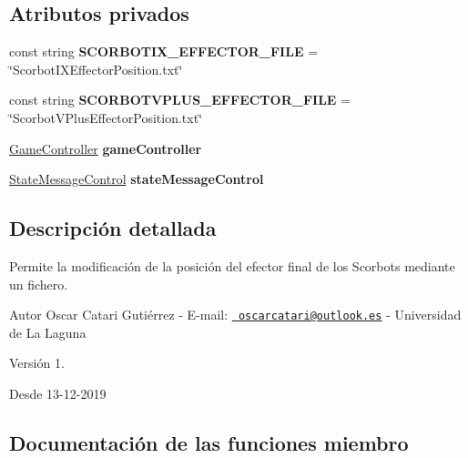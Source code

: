 \subsection*{Atributos privados}
\begin{DoxyCompactItemize}
\item 
\mbox{\label{class_effector_file_control_aeb6ee05c1ee77d1980e98e2849338985}} 
const string {\bfseries S\+C\+O\+R\+B\+O\+T\+I\+X\+\_\+\+E\+F\+F\+E\+C\+T\+O\+R\+\_\+\+F\+I\+LE} = \char`\"{}Scorbot\+I\+X\+Effector\+Position.\+txt\char`\"{}
\item 
\mbox{\label{class_effector_file_control_a1f2d3cccfad73eb793f6c4cbc4a9cf4c}} 
const string {\bfseries S\+C\+O\+R\+B\+O\+T\+V\+P\+L\+U\+S\+\_\+\+E\+F\+F\+E\+C\+T\+O\+R\+\_\+\+F\+I\+LE} = \char`\"{}Scorbot\+V\+Plus\+Effector\+Position.\+txt\char`\"{}
\item 
\mbox{\label{class_effector_file_control_a6fcde661797253af8d1ad25f18d9c691}} 
\mbox{\hyperlink{class_game_controller}{Game\+Controller}} {\bfseries game\+Controller}
\item 
\mbox{\label{class_effector_file_control_ac194b508c0cdfed19f1a89365a222037}} 
\mbox{\hyperlink{class_state_message_control}{State\+Message\+Control}} {\bfseries state\+Message\+Control}
\end{DoxyCompactItemize}


\subsection{Descripción detallada}
Permite la modificación de la posición del efector final de los Scorbots mediante un fichero. \begin{DoxyAuthor}{Autor}
Oscar Catari Gutiérrez -\/ E-\/mail\+: \href{mailto:oscarcatari@outlook.es}{\texttt{ oscarcatari@outlook.\+es}} -\/ Universidad de La Laguna 
\end{DoxyAuthor}
\begin{DoxyVersion}{Versión}
1. 
\end{DoxyVersion}
\begin{DoxySince}{Desde}
13-\/12-\/2019 
\end{DoxySince}


\subsection{Documentación de las funciones miembro}
\mbox{\label{class_effector_file_control_a1239eff6ba957cbd61db6eaf072d60d2}} 
